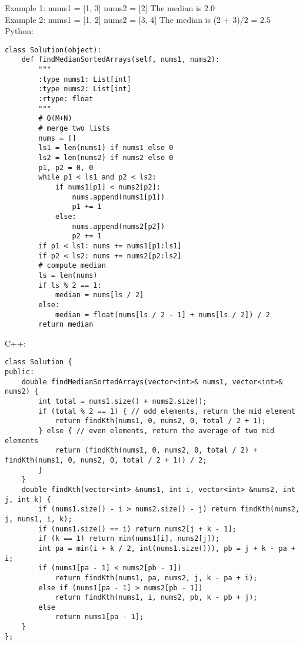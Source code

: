 Example 1:
nums1 = [1, 3]
nums2 = [2]
The median is 2.0\\

Example 2:
nums1 = [1, 2]
nums2 = [3, 4]
The median is (2 + 3)/2 = 2.5\\

Python:
\lstset{language=python}
\begin{lstlisting}
class Solution(object):
    def findMedianSortedArrays(self, nums1, nums2):
        """
        :type nums1: List[int]
        :type nums2: List[int]
        :rtype: float
        """
        # O(M+N)
        # merge two lists
        nums = []
        ls1 = len(nums1) if nums1 else 0
        ls2 = len(nums2) if nums2 else 0
        p1, p2 = 0, 0
        while p1 < ls1 and p2 < ls2:
            if nums1[p1] < nums2[p2]:
                nums.append(nums1[p1])
                p1 += 1
            else:
                nums.append(nums2[p2])
                p2 += 1
        if p1 < ls1: nums += nums1[p1:ls1]
        if p2 < ls2: nums += nums2[p2:ls2]
        # compute median
        ls = len(nums)
        if ls % 2 == 1: 
            median = nums[ls / 2]
        else: 
            median = float(nums[ls / 2 - 1] + nums[ls / 2]) / 2
        return median
\end{lstlisting}        

C++:
\lstset{language=C++}
\begin{lstlisting}
class Solution {
public:
    double findMedianSortedArrays(vector<int>& nums1, vector<int>& nums2) {
        int total = nums1.size() + nums2.size();
        if (total % 2 == 1) { // odd elements, return the mid element
            return findKth(nums1, 0, nums2, 0, total / 2 + 1);
        } else { // even elements, return the average of two mid elements
            return (findKth(nums1, 0, nums2, 0, total / 2) + findKth(nums1, 0, nums2, 0, total / 2 + 1)) / 2;
        }
    }
    double findKth(vector<int> &nums1, int i, vector<int> &nums2, int j, int k) {
        if (nums1.size() - i > nums2.size() - j) return findKth(nums2, j, nums1, i, k);
        if (nums1.size() == i) return nums2[j + k - 1];
        if (k == 1) return min(nums1[i], nums2[j]);
        int pa = min(i + k / 2, int(nums1.size())), pb = j + k - pa + i;
        if (nums1[pa - 1] < nums2[pb - 1]) 
            return findKth(nums1, pa, nums2, j, k - pa + i);
        else if (nums1[pa - 1] > nums2[pb - 1]) 
            return findKth(nums1, i, nums2, pb, k - pb + j);
        else 
            return nums1[pa - 1];
    }
};
\end{lstlisting}


